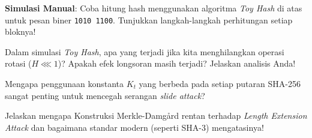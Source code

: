 \begin{aktivitas}
  \item \textbf{Simulasi Manual}: Coba hitung hash menggunakan algoritma \textit{Toy Hash} di atas untuk pesan biner \texttt{1010 1100}. Tunjukkan langkah-langkah perhitungan setiap bloknya!
\end{aktivitas}

\begin{latihan}
  \item Dalam simulasi \textit{Toy Hash}, apa yang terjadi jika kita menghilangkan operasi rotasi ($H \lll 1$)? Apakah efek longsoran masih terjadi? Jelaskan analisis Anda!
  \item Mengapa penggunaan konstanta $K_t$ yang berbeda pada setiap putaran SHA-256 sangat penting untuk mencegah serangan \textit{slide attack}?
  \item Jelaskan mengapa Konstruksi Merkle-Damgård rentan terhadap \textit{Length Extension Attack} dan bagaimana standar modern (seperti SHA-3) mengatasinya!
\end{latihan}

